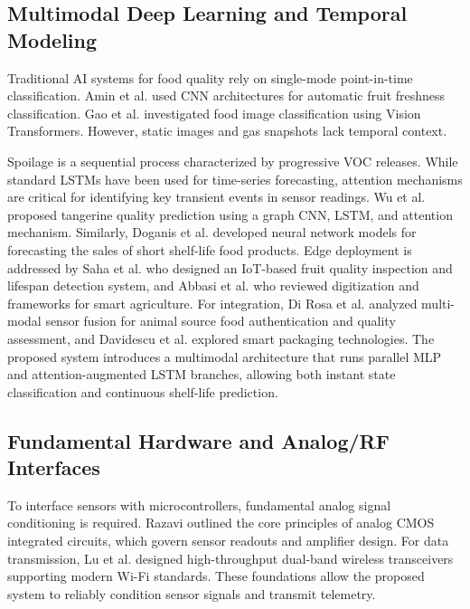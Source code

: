 \subsection{Multimodal Deep Learning and Temporal Modeling}
Traditional AI systems for food quality rely on single-mode point-in-time classification. Amin et al. \cite{Palakodati2020} used CNN architectures for automatic fruit freshness classification. Gao et al. \cite{VisionBasedTransformer2023} investigated food image classification using Vision Transformers. However, static images and gas snapshots lack temporal context. 

Spoilage is a sequential process characterized by progressive VOC releases. While standard LSTMs have been used for time-series forecasting, attention mechanisms are critical for identifying key transient events in sensor readings. Wu et al. \cite{AttentionRNNFood2022} proposed tangerine quality prediction using a graph CNN, LSTM, and attention mechanism. Similarly, Doganis et al. \cite{AttentionLSTMForecasting2023} developed neural network models for forecasting the sales of short shelf-life food products. Edge deployment is addressed by Saha et al. \cite{SmartIoTEdgeAI2022} who designed an IoT-based fruit quality inspection and lifespan detection system, and Abbasi et al. \cite{EdgeAIReview2022} who reviewed digitization and frameworks for smart agriculture. For integration, Di Rosa et al. \cite{MultiModalSensorFusion2023} analyzed multi-modal sensor fusion for animal source food authentication and quality assessment, and Davidescu et al. \cite{IoTEnabledSmartPackaging2020} explored smart packaging technologies. The proposed system introduces a multimodal architecture that runs parallel MLP and attention-augmented LSTM branches, allowing both instant state classification and continuous shelf-life prediction.

\subsection{Fundamental Hardware and Analog/RF Interfaces}
To interface sensors with microcontrollers, fundamental analog signal conditioning is required. Razavi \cite{Razavi2000} outlined the core principles of analog CMOS integrated circuits, which govern sensor readouts and amplifier design. For data transmission, Lu et al. \cite{Lu2023} designed high-throughput dual-band wireless transceivers supporting modern Wi-Fi standards. These foundations allow the proposed system to reliably condition sensor signals and transmit telemetry.

